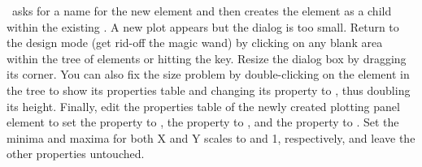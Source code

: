 \ejs\ asks for a name for the new element and then creates the element as a child within the existing . A new plot appears but the dialog is too small.  Return to the design mode (get rid-off the magic wand) by clicking on any blank area within the tree of elements or hitting the  key. Resize the dialog box by dragging its corner. You can also fix the size problem by double-clicking on the  element in the tree to show its properties table and changing its  property to , thus doubling its height. Finally, edit the properties table of the newly created plotting panel element to set the  property to , the  property to , and the  property to . Set the minima and maxima for both X and Y scales to  and {1}, respectively, and leave the other properties untouched.


